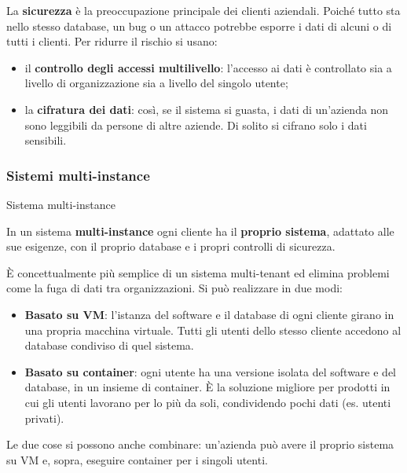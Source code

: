 La \textbf{sicurezza} è la preoccupazione principale dei clienti
aziendali. Poiché tutto sta nello stesso database, un bug o un attacco
potrebbe esporre i dati di alcuni o di tutti i clienti. Per ridurre il
rischio si usano:

\begin{itemize}
\tightlist
\item
  il \textbf{controllo degli accessi multilivello}: l'accesso ai dati è
  controllato sia a livello di organizzazione sia a livello del singolo
  utente;
\item
  la \textbf{cifratura dei dati}: così, se il sistema si guasta, i dati
  di un'azienda non sono leggibili da persone di altre aziende. Di
  solito si cifrano solo i dati sensibili.
\end{itemize}

\subsubsection{Sistemi multi-instance}\label{sistemi-multi-instance}

\begin{boxdefinition}{Sistema multi-instance}

In un sistema \textbf{multi-instance} ogni cliente ha il \textbf{proprio
sistema}, adattato alle sue esigenze, con il proprio database e i propri
controlli di sicurezza.

\end{boxdefinition}

È concettualmente più semplice di un sistema multi-tenant ed elimina
problemi come la fuga di dati tra organizzazioni. Si può realizzare in
due modi:

\begin{itemize}
\tightlist
\item
  \textbf{Basato su VM}: l'istanza del software e il database di ogni
  cliente girano in una propria macchina virtuale. Tutti gli utenti
  dello stesso cliente accedono al database condiviso di quel sistema.
\item
  \textbf{Basato su container}: ogni utente ha una versione isolata del
  software e del database, in un insieme di container. È la soluzione
  migliore per prodotti in cui gli utenti lavorano per lo più da soli,
  condividendo pochi dati (es. utenti privati).
\end{itemize}

Le due cose si possono anche combinare: un'azienda può avere il proprio
sistema su VM e, sopra, eseguire container per i singoli utenti.


